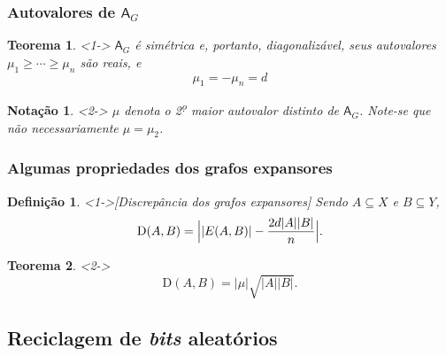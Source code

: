 \documentclass{beamer}
\def\upo{\textsuperscript{\d o}\xspace}
\def\MMD{\mathrm{D}} %
\def\MMp{\mathrm{.}} %
\def\geq{\geqslant} %
\def\cardi#1{\lvert #1 \rvert} %
\def\Bigcardi#1{\Bigl\lvert #1 \Bigr\rvert}
\def\matriz#1{\mathsf{#1}}
\theoremstyle{teoaxicorlem}
\newtheorem{Teo}{Teorema}
\theoremstyle{defnotnom}
\newtheorem{Def}{Definição}
\newtheorem{Not}{Notação}
\begin{document}
\begin{frame}
  \frametitle{Autovalores de ${\matriz A}_G$}
  \begin{Teo}<1->
    ${\matriz A}_G$
    é simétrica e, portanto, diagonalizável, seus autovalores
    $\mu_1\geq\dotsb\geq\mu_n$ são reais, e
    \begin{equation*}
      \mu_1 = -\mu_n = d
    \end{equation*}
  \end{Teo}
  \vfill
  \begin{Not}<2->
    $\mu$ denota o 2\upo maior autovalor \alert{distinto}
    de ${\matriz
      A}_G$. Note-se que \alert{não necessariamente} $\mu=\mu_2$.
  \end{Not}
\end{frame}

\begin{frame}
  \frametitle{Algumas propriedades dos grafos expansores}
  \begin{Def}<1->[Discrepância dos grafos expansores]
    Sendo $A\subseteq X$ e $B\subseteq Y$,
    \begin{equation*}
      \MMD(A,B) =
      \Bigcardi{\cardi{E(A,B)}-\frac{2d\cardi{A}\cardi{B}}%
      {n}}\MMp
    \end{equation*}
  \end{Def}
  \vfill
  \begin{Teo}<2->
    \begin{equation*}
      \MMD(A,B) = \cardi{\mu}\sqrt{\cardi{A}\cardi{B}}\MMp
    \end{equation*}
  \end{Teo}
\end{frame}

\subsection{Reciclagem de {\itshape bits} aleatórios}
\end{document}
